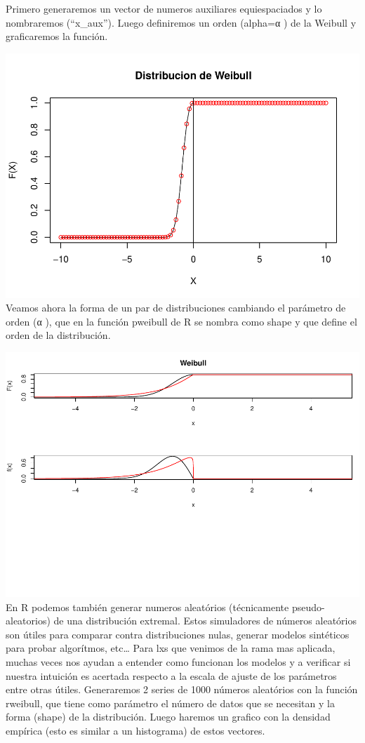 \documentclass[
  12pt]{article}
\begin{document}
Primero generaremos un vector de numeros auxiliares equiespaciados y lo
nombraremos (``x\_aux''). Luego definiremos un orden (alpha=α ) de la
Weibull y graficaremos la función.

\includegraphics{extremales_files/figure-latex/unnamed-chunk-16-1.pdf}
Veamos ahora la forma de un par de distribuciones cambiando el parámetro
de orden (α ), que en la función pweibull de R se nombra como shape y
que define el orden de la distribución.

\includegraphics{extremales_files/figure-latex/unnamed-chunk-17-1.pdf}
En R podemos también generar numeros aleatórios (técnicamente
pseudo-aleatorios) de una distribución extremal. Estos simuladores de
números aleatórios son útiles para comparar contra distribuciones nulas,
generar modelos sintéticos para probar algorítmos, etc\ldots{} Para lxs
que venimos de la rama mas aplicada, muchas veces nos ayudan a entender
como funcionan los modelos y a verificar si nuestra intuición es
acertada respecto a la escala de ajuste de los parámetros entre otras
útiles. Generaremos 2 series de 1000 números aleatórios con la función
rweibull, que tiene como parámetro el número de datos que se necesitan y
la forma (shape) de la distribución. Luego haremos un grafico con la
densidad empírica (esto es similar a un histograma) de estos vectores.
\end{document}
